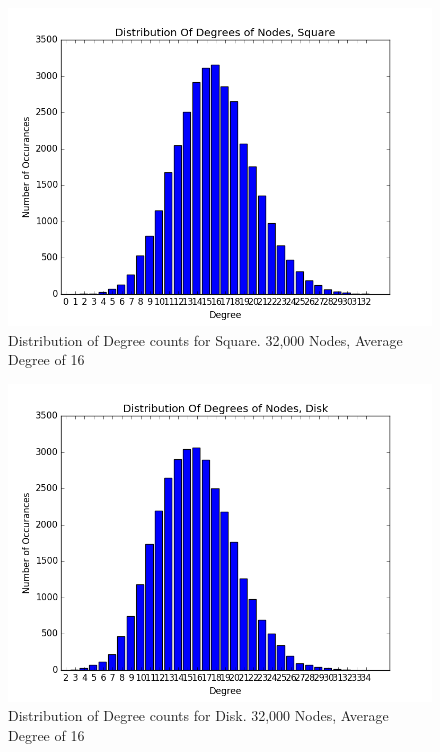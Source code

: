 \documentclass{article}
\begin{document}
\begin{center}
    \begin{figure}
        \includegraphics[scale=0.45]{./graphs/hist_deg_square.png}
        \caption{Distribution of Degree counts for Square. 32,000 Nodes, Average Degree of 16}
        \label{squaredeghist}
    \end{figure}
\end{center}

\begin{center}
    \begin{figure}
        \includegraphics[scale=0.45]{./graphs/hist_deg_disk.png}
        \caption{Distribution of Degree counts for Disk. 32,000 Nodes, Average Degree of 16}
        \label{diskdeghist}
    \end{figure}
\end{center}
\end{document}
